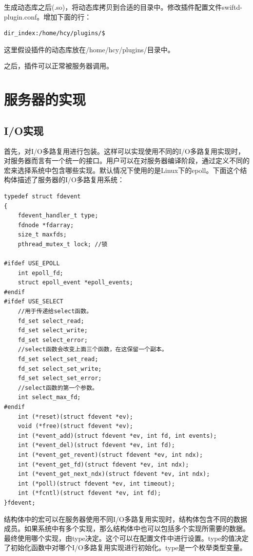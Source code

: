\documentclass[12pt, twoside, a4paper, xetex]{report}
\begin{document}
	生成动态库之后(.so)，将动态库拷贝到合适的目录中。修改插件配置文件swiftd-plugin.conf。增加下面的行：
	
	\begin{verbatim}
dir_index:/home/hcy/plugins/$
	\end{verbatim}
	
	这里假设插件的动态库放在/home/hcy/plugins/目录中。
	
	之后，插件可以正常被服务器调用。
	
\section{服务器的实现}

\subsection{I/O实现}
	首先，对I/O多路复用进行包装。这样可以实现使用不同的I/O多路复用实现时，对服务器而言有一个统一的接口。用户可以在对服务器编译阶段，通过定义不同的宏来选择系统中包含哪些实现。默认情况下使用的是Linux下的epoll。下面这个结构体描述了服务器的I/O多路复用系统：
	
\begin{verbatim}	
typedef struct fdevent
{
	fdevent_handler_t type;
	fdnode *fdarray;
	size_t maxfds;
	pthread_mutex_t lock; //锁

#ifdef USE_EPOLL
	int epoll_fd;
	struct epoll_event *epoll_events;
#endif
#ifdef USE_SELECT
	//用于传递给select函数。
	fd_set select_read;
	fd_set select_write;
	fd_set select_error;
	//select函数会改变上面三个函数，在这保留一个副本。
	fd_set select_set_read;
	fd_set select_set_write;
	fd_set select_set_error;
	//select函数的第一个参数。
	int select_max_fd;
#endif
	int (*reset)(struct fdevent *ev);
	void (*free)(struct fdevent *ev);
	int (*event_add)(struct fdevent *ev, int fd, int events);
	int (*event_del)(struct fdevent *ev, int fd);
	int (*event_get_revent)(struct fdevent *ev, int ndx);
	int (*event_get_fd)(struct fdevent *ev, int ndx);
	int (*event_get_next_ndx)(struct fdevent *ev, int ndx);
	int (*poll)(struct fdevent *ev, int timeout);
	int (*fcntl)(struct fdevent *ev, int fd);
}fdevent;
\end{verbatim}

	结构体中的宏可以在服务器使用不同I/O多路复用实现时，结构体包含不同的数据成员。如果系统中有多个实现，那么结构体中也可以包括多个实现所需要的数据。最终使用哪个实现，由type决定。这个可以在配置文件中进行设置。type的值决定了初始化函数中对哪个I/O多路复用实现进行初始化。type是一个枚举类型变量。
	
\end{document}
